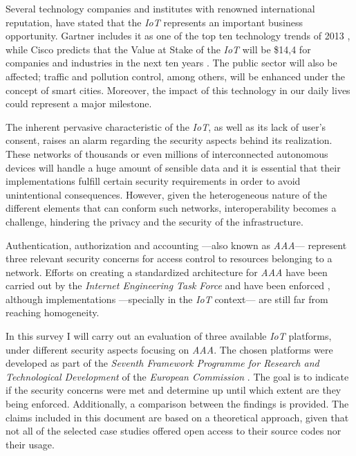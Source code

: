 \documentclass[journal]{IEEEtran}
\begin{document}
  Several technology companies and institutes with renowned international reputation, have stated that the \emph{IoT} represents an important business opportunity. Gartner includes it as one of the top ten technology trends of 2013 \cite{Gartner2012}, while Cisco predicts that the Value at Stake of the \emph{IoT} will be \$14,4 for companies and industries in the next ten years \cite{JosephBradley2013}. The public sector will also be affected; traffic and pollution control, among others, will be enhanced under the concept of smart cities. Moreover, the impact of this technology in our daily lives could represent a major milestone.

  The inherent pervasive characteristic of the \emph{IoT}, as well as its lack of user's consent, raises an alarm regarding the security aspects behind its realization. These networks of thousands or even millions of interconnected autonomous devices will handle a huge amount of sensible data and it is essential that their implementations fulfill certain security requirements in order to avoid unintentional consequences. However, given the heterogeneous nature of the different elements that can conform such networks, interoperability becomes a challenge, hindering the privacy and the security of the infrastructure.

  Authentication, authorization and accounting ---also known as \emph{AAA}--- represent three relevant security concerns for access control to resources belonging to a network. Efforts on creating a standardized architecture for \emph{AAA} have been carried out by the \emph{Internet Engineering Task Force} and have been enforced \cite{RFC2903}, \cite{RFC2904} although implementations ---specially in the \emph{IoT} context--- are still far from reaching homogeneity.
   
  In this survey I will carry out an evaluation of three available \emph{IoT} platforms, under different security aspects focusing on \emph{AAA}. The chosen platforms were developed as part of the \emph{Seventh Framework Programme for Research and Technological Development} of the \emph{European Commission} \cite{FP7}. The goal is to indicate if the security concerns were met and determine up until which extent are they being enforced. Additionally, a comparison between the findings is provided. The claims included in this document are based on a theoretical approach, given that not all of the selected case studies offered open access to their source codes nor their usage.
\end{document}
